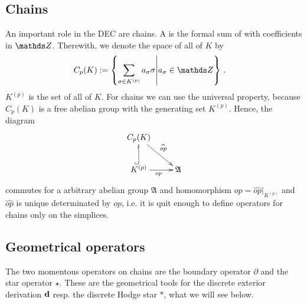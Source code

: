     \subsection{Chains}
    An important role in the DEC are chains. 
    A  is the formal sum of  with coefficients in \( \Z \). 
    Therewith, we denote the space of all  of \( K \)  by
    \begin{align}
      C_{p}(K) &:= \left\{\sum_{\sigma\in K^{(p)}}a_{\sigma}\sigma \middle| a_{\sigma}\in\Z \right\} \formpunkt
    \end{align}
    \( K^{(p)} \) is the set of all  of \( K \). 
    For chains we can use the universal property, because \( C_{p}(K) \) is a free abelian group with the generating set \( K^{(p)} \).
    Hence, the diagram
    \begin{align}
    \begin{xy}
      \xymatrix{
        C_{p}(K) \ar[rd]^{\widehat{op}} & \\
        K^{(p)} \ar@^{(->}[u] \ar[r]_{op}& \mathfrak{A}
      }
    \end{xy}
  \end{align}
  commutes for a arbitrary abelian group \( \mathfrak{A} \) and homomorphism \( op = \widehat{op}|_{K^{(p)}} \) 
  and \( \widehat{op} \) is unique determinated by \( op \),
  i.e. it is quit enough to define operators for chains only on the simplices. 
  
  \subsection{Geometrical operators}
    The two momentous operators on chains are the boundary operator \( \partial \) and the star operator \( \star \).
    These are the geometrical tools for the discrete exterior derivation \( \mathbf{d} \) resp. the discrete Hodge star \( * \),
    what we will see below.

